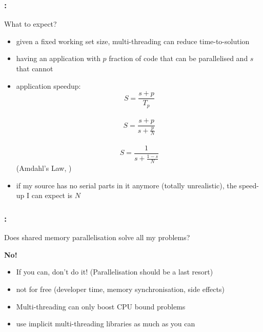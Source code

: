 \documentclass[9pt,xcolor=table]{beamer}
\begin{document}
\begin{frame}
\frametitle{\insertsectionhead{}: \insertsubsectionhead{}}
\begin{block}{What to expect?}
  \begin{itemize}
  \item given a fixed working set size, multi-threading can reduce time-to-solution
  \item having an application with $p$ fraction of code that can be parallelised and $s$ that cannot
  \item application speedup:\\
    $$ S = \frac{s+p}{T_p} $$\\
    $$ S = \frac{s+p}{s+\frac{p}{N}}$$\\
    $$ S = \frac{1}{s + \frac{1-s}{N}}$$ (Amdahl's Law, \cite{AmdahlsArgument})
  \item if my source has no serial parts in it anymore (totally unrealistic), the speed-up I can expect is $N$
  \end{itemize}
\end{block}
\end{frame}

\begin{frame}
\frametitle{\insertsectionhead{}: \insertsubsectionhead{}}
\large
\begin{alertblock}{Does shared memory parallelisation solve all my problems?}
  \pause
  \begin{center}
    \huge{}\bfseries{}No!
  \end{center}
\end{alertblock}
\vfill
\begin{itemize}
\item \alert{If you can, don't do it!} (Parallelisation should be a last resort)
\item not for free (developer time, memory synchronisation, side effects)
\item Multi-threading can only boost CPU bound problems
\item use implicit multi-threading libraries as much as you can
\end{itemize}
\vfill
\end{frame}
\end{document}

